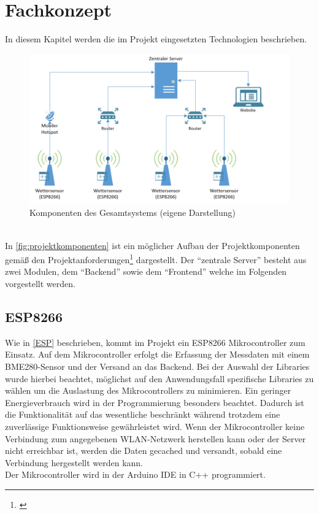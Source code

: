 \section{Fachkonzept}
In diesem Kapitel werden die im Projekt eingesetzten Technologien beschrieben.\\
\begin{figure}[h]
    \centering
    \includegraphics[width=0.7\linewidth]{img/projektkomponenten}
    \caption[Komponenten des Gesamtsystems]{Komponenten des Gesamtsystems (eigene Darstellung)}
    \label{fig:projektkomponenten}
\end{figure}
\\
In \autoref{fig:projektkomponenten} ist ein möglicher Aufbau der Projektkomponenten gemäß den Projektanforderungen\footnote{\cite{Wortmann.2020}} dargestellt.
Der \enquote{zentrale Server} besteht aus zwei Modulen, dem \enquote{Backend} sowie dem \enquote{Frontend} welche im Folgenden vorgestellt werden.

\subsection{ESP8266}
Wie in \autoref{ESP} beschrieben, kommt im Projekt ein ESP8266 Mikrocontroller zum Einsatz.
Auf dem Mikrocontroller erfolgt die Erfassung der Messdaten mit einem BME280-Sensor und der Versand an das Backend.
Bei der Auswahl der Libraries wurde hierbei beachtet, möglichst auf den Anwendungsfall spezifische Libraries zu wählen um die Auslastung des Mikrocontrollers zu minimieren.
Ein geringer Energieverbrauch wird in der Programmierung besonders beachtet.
Dadurch ist die Funktionalität auf das wesentliche beschränkt während trotzdem eine zuverlässige Funktionsweise gewährleistet wird.
Wenn der Mikrocontroller keine Verbindung zum angegebenen WLAN-Netzwerk herstellen kann oder der Server nicht erreichbar ist, werden die Daten gecached und versandt, sobald eine Verbindung hergestellt werden kann.\\
Der Mikrocontroller wird in der Arduino IDE in C++ programmiert.

